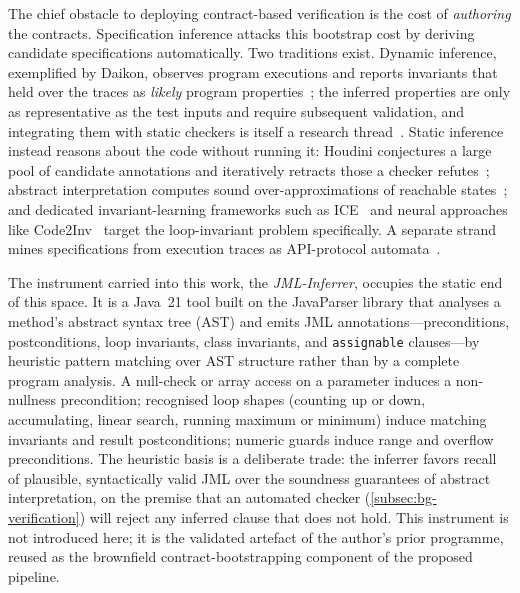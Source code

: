 The chief obstacle to deploying contract-based verification is the cost of \emph{authoring} the contracts. Specification inference attacks this bootstrap cost by deriving candidate specifications automatically. Two traditions exist. Dynamic inference, exemplified by Daikon, observes program executions and reports invariants that held over the traces as \emph{likely} program properties~\cite{ernst2007daikon}; the inferred properties are only as representative as the test inputs and require subsequent validation, and integrating them with static checkers is itself a research thread~\cite{nimmer2001static}. Static inference instead reasons about the code without running it: Houdini conjectures a large pool of candidate annotations and iteratively retracts those a checker refutes~\cite{flanagan2001houdini}; abstract interpretation computes sound over-approximations of reachable states~\cite{cousot1977abstract}; and dedicated invariant-learning frameworks such as ICE~\cite{garg2014ice} and neural approaches like Code2Inv~\cite{si2018learning} target the loop-invariant problem specifically. A separate strand mines specifications from execution traces as API-protocol automata~\cite{ammons2002mining}.

The instrument carried into this work, the \emph{JML-Inferrer}, occupies the static end of this space. It is a Java~21 tool built on the JavaParser library that analyses a method's abstract syntax tree (AST) and emits JML annotations---preconditions, postconditions, loop invariants, class invariants, and \texttt{assignable} clauses---by heuristic pattern matching over AST structure rather than by a complete program analysis. A null-check or array access on a parameter induces a non-nullness precondition; recognised loop shapes (counting up or down, accumulating, linear search, running maximum or minimum) induce matching invariants and result postconditions; numeric guards induce range and overflow preconditions. The heuristic basis is a deliberate trade: the inferrer favors recall of plausible, syntactically valid JML over the soundness guarantees of abstract interpretation, on the premise that an automated checker (\cref{subsec:bg-verification}) will reject any inferred clause that does not hold. This instrument is not introduced here; it is the validated artefact of the author's prior programme, reused as the brownfield contract-bootstrapping component of the proposed pipeline.

